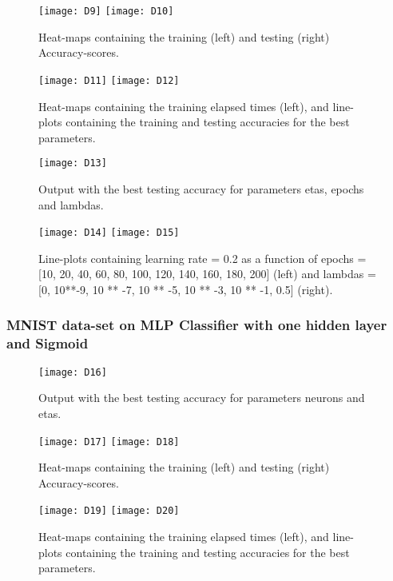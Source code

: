 \begin{figure}[H]
\label{fig:D6}
\centering
\texttt{[image: D9]}
\texttt{[image: D10]}
\caption{Heat-maps containing the training (left) and testing (right) Accuracy-scores.}
\end{figure}

\begin{figure}[H]
\label{fig:D7}
\centering
\texttt{[image: D11]}
\texttt{[image: D12]}
\caption{Heat-maps containing the training elapsed times (left), and line-plots containing the training and testing accuracies for the best parameters.}
\end{figure}

\begin{figure}[H]
\label{fig:D8}
\centering
\texttt{[image: D13]}
\caption{Output with the best testing accuracy for parameters etas, epochs and lambdas.}
\end{figure}

\begin{figure}[H]
\label{fig:D9}
\centering
\texttt{[image: D14]}
\texttt{[image: D15]}
\caption{Line-plots containing learning rate = 0.2 as a function of epochs = [10, 20, 40, 60, 80, 100, 120, 140, 160, 180, 200] (left) and lambdas = [0, 10**-9, 10 ** -7, 10 ** -5, 10 ** -3, 10 ** -1, 0.5] (right).}
\end{figure}

\subsubsection{MNIST data-set on MLP Classifier with one hidden layer and Sigmoid}
\label{chap:MNIST data-set on MLP Classifier with one hidden layer and Sigmoid}

\begin{figure}[H]
\label{fig:D10}
\centering
\texttt{[image: D16]}
\caption{Output with the best testing accuracy for parameters neurons and etas.}
\end{figure}

\begin{figure}[H]
\label{fig:D11}
\centering
\texttt{[image: D17]}
\texttt{[image: D18]}
\caption{Heat-maps containing the training (left) and testing (right) Accuracy-scores.}
\end{figure}

\begin{figure}[H]
\label{fig:D12}
\centering
\texttt{[image: D19]}
\texttt{[image: D20]}
\caption{Heat-maps containing the training elapsed times (left), and line-plots containing the training and testing accuracies for the best parameters.}
\end{figure}

